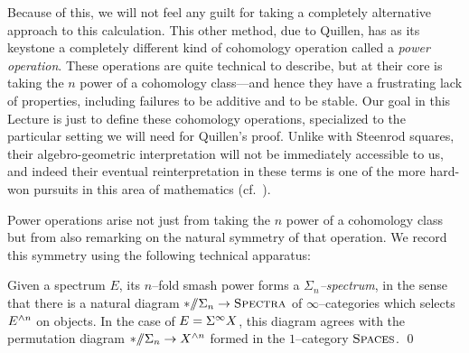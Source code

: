 Because of this, we will not feel any guilt for taking a completely alternative approach to this calculation.  This other method, due to Quillen, has as its keystone a completely different kind of cohomology operation called a \textit{power operation}.  These operations are quite technical to describe, but at their core is taking the \(n\){\th} power of a cohomology class---and hence they have a frustrating lack of properties, including failures to be additive and to be stable.  Our goal in this Lecture is just to define these cohomology operations, specialized to the particular setting we will need for Quillen's proof.  Unlike with Steenrod squares, their algebro-geometric interpretation will not be immediately accessible to us, and indeed their eventual reinterpretation in these terms is one of the more hard-won pursuits in this area of mathematics (cf.\ ).

Power operations arise not just from taking the \(n\){\th} power of a cohomology class but from also remarking on the natural symmetry of that operation.  We record this symmetry using the following technical apparatus:
\begin{lemma}
Given a spectrum \(E\), its \(n\)--fold smash power forms a \textit{\(\Sigma_n\)--spectrum}, in the sense that there is a natural diagram \(* /\!\!/ \Sigma_n \to \normalfont\textsc{Spectra}\) of \(\infty\)--categories which selects \(E^{\wedge n}\) on objects.  In the case of $E = \Sigma^\infty X$, this diagram agrees with the permutation diagram \(* /\!\!/ \Sigma_n \to X^{\wedge n}\) formed in the \(1\)--category \(\normalfont\textsc{Spaces}\). \qed
\end{lemma}


